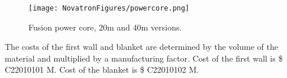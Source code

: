





\begin{figure}[h!]
    \centering
    \texttt{[image: NovatronFigures/powercore.png]}
    \caption{ Fusion power core, 20m and 40m versions.}
    \label{fig:cad}
\end{figure}

The costs of the first wall and blanket are determined by the volume of the material and multiplied by a manufacturing factor.   Cost of the first wall is \$ C22010101 M.  Cost of the blanket is \$ C22010102 M.

